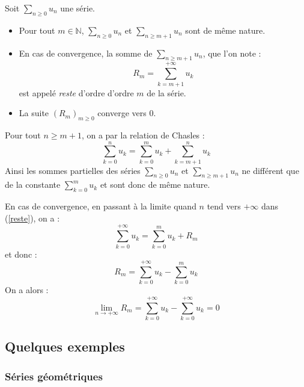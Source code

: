 \documentclass[french,11pt,twoside]{VcCours}
\newcommand{\Sum}[2]{\ensuremath{\textstyle{\sum\limits_{#1}^{#2}}}}
\begin{document}
\begin{TheoremeDefinition}{}
Soit $\Sum{n\geq 0}{} u_n$ une série.
\begin{itemize}
\item Pour tout $m \in \mathbb{N}$, $\Sum{n\geq 0}{}u_n$ et $\Sum{n\geq m+1}{}u_n$ sont de même nature.
\item En cas de convergence, la somme de $\Sum{n\geq m+1}{}u_n$, que l'on note :
$$ R_m = \sum_{k= m+1}^{+\infty}u_k$$
est appelé \emph{reste} d'ordre d'ordre $m$ de la série. 
\item La suite $(R_m)_{m \geq 0}$ converge vers $0$.
\end{itemize}
\end{TheoremeDefinition}
%
\begin{Demonstration}{}


Pour tout $n \geq m+1$, on a par la relation de Chasles :
\begin{equation}\label{reste}
\sum_{k=0}^{n} u_k = \sum_{k=0}^{m} u_k + \sum_{k=m+1}^{n} u_k
\end{equation}
Ainsi les sommes partielles des séries $\Sum{n\geq 0}{}u_n$ et $\Sum{n\geq m+1}{}u_n$ ne différent que de la constante $\Sum{k=0}{m} u_k$ et sont donc de même nature.

En cas de convergence, en passant à la limite quand $n$ tend vers $+ \infty$ dans (\ref{reste}), on a :
$$ \sum_{k=0}^{+ \infty} u_k = \sum_{k=0}^{m} u_k + R_m$$
et donc :
$$ R_m = \sum_{k=0}^{+ \infty} u_k - \sum_{k=0}^{m} u_k$$
On a alors :
$$ \lim_{n \rightarrow + \infty} R_m = \sum_{k=0}^{+ \infty} u_k - \sum_{k=0}^{+ \infty} u_k = 0$$
\end{Demonstration}
%


\newpage
\subsection{Quelques exemples}
\subsubsection{Séries géométriques}
\end{document}
